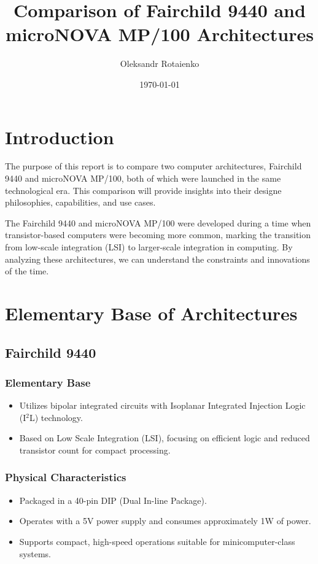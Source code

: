 \documentclass[a4paper,12pt]{article}
\title{Comparison of Fairchild 9440 and microNOVA MP/100 Architectures}
\author{Oleksandr Rotaienko}
\date{\today}
\begin{document}
\maketitle

\tableofcontents
\newpage

\section{Introduction}

The purpose of this report is to compare two computer architectures, Fairchild 9440 and microNOVA MP/100, both of which were launched in the same technological era. This comparison will provide insights into their designe philosophies, capabilities, and use cases.

The Fairchild 9440 and microNOVA MP/100 were developed during a time when transistor-based computers were becoming more common, marking the transition from low-scale integration (LSI) to larger-scale integration in computing. By analyzing these architectures, we can understand the constraints and innovations of the time.

\section{Elementary Base of Architectures}

\subsection{Fairchild 9440}

\subsubsection{Elementary Base}
\begin{itemize}
    \item Utilizes bipolar integrated circuits with Isoplanar Integrated Injection Logic (I$^2$L) technology.
    \item Based on Low Scale Integration (LSI), focusing on efficient logic and reduced transistor count for compact processing.
\end{itemize}

\subsubsection{Physical Characteristics}
\begin{itemize}
    \item Packaged in a 40-pin DIP (Dual In-line Package).
    \item Operates with a 5V power supply and consumes approximately 1W of power.
    \item Supports compact, high-speed operations suitable for minicomputer-class systems.
\end{itemize}
\end{document}
